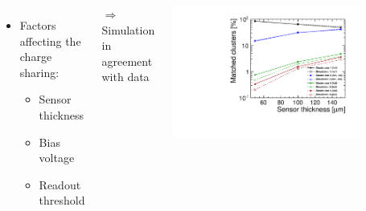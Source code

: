\begin{frame}
\begin{columns}[t]
  \end{columns}

  \vspace{-0.5cm}
  \begin{columns}
    \begin{itemize}
    \item Factors affecting the charge sharing:
      \begin{itemize}
      \item Sensor thickness
      \item Bias voltage
      \item Readout threshold 
      \end{itemize}
    \end{itemize}

    $\Rightarrow$ Simulation in agreement with data

    \centering
    \includegraphics[width=0.8\textwidth]{../figures/TestBeam/cluSize_vs_thickness.pdf}
  \end{columns}

\end{frame}

